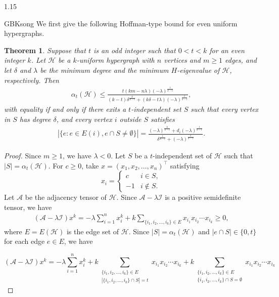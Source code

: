 \documentclass[preprint,12pt]{elsarticle}
\newtheorem{thm}{Theorem}[section]
\begin{document}
\begin{spacing}{1.15}
\begin{CJK*}{GBK}{song}
We first give the following Hoffman-type bound for even uniform hypergraphs.
\begin{thm}\label{t}
Suppose that $t$ is an odd integer such that $0<t<k$ for an even integer $k$. Let $\mathcal{H}$ be a $k$-uniform hypergraph with $n$ vertices and $m\geq1$ edges, and let $\delta$ and $\lambda$ be the minimum degree and the minimum $H$-eigenvalue of $\mathcal{H}$, respectively. Then
\begin{eqnarray*}
{\alpha _t}(\mathcal{H}) \leqslant \frac{{t\left( {km - n \lambda } \right){{\left( { - \lambda } \right)}^{\frac{t}{{k - t}}}}}}{{\left( {k - t} \right){\delta ^{\frac{k}{{k - t}}}} + \left( {k \delta  - t\lambda } \right){{\left( { - \lambda } \right)}^{\frac{t}{{k - t}}}}}},
\end{eqnarray*}
with equality if and only if there exits a $t$-independent set $S$ such that every vertex in $S$ has degree $\delta$, and every vertex $i$ outside $S$ satisfies
\begin{eqnarray*}
\left| {\{ e:e \in E(i),e\cap S\neq\emptyset \} } \right| = \frac{{{{\left( { - \lambda } \right)}^{\frac{k}{{k - t}}}} + {d_i}{{\left( { - \lambda } \right)}^{\frac{t}{{k - t}}}}}}{{{\delta ^{\frac{t}{{k - t}}}} + {{\left( { - \lambda } \right)}^{\frac{t}{{k - t}}}}}}.
\end{eqnarray*}
\end{thm}
\begin{proof}
Since $m\geq1$, we have $\lambda<0$. Let $S$ be a $t$-independent set of $\mathcal{H}$ such that $|S|=\alpha_t(\mathcal{H})$. For $c\geq0$, take $x=(x_1,x_2,\ldots,x_n)^\top$ satisfying
$${x_i} =
\begin{cases}
c & i \in S,\\
- 1 & i \notin S.
\end{cases}
$$
Let $\mathcal{A}$ be the adjacency tensor of $\mathcal{H}$. Since $\mathcal{A}-\lambda \mathcal{I}$ is a positive semidefinite tensor, we have
\begin{eqnarray*}
(\mathcal{A}-\lambda \mathcal{I})x^k=-\lambda\sum_{i=1}^nx_i^{k}+k\sum_{\{ i_1,i_2,\ldots,i_k\}\in E}x_{i_1}x_{i_2}\cdots x_{i_k}\geq0,
\end{eqnarray*}
where $E=E(\mathcal{H})$ is the edge set of $\mathcal{H}$.
Since $|S|=\alpha_t(\mathcal{H})$ and $|e\cap S|\in\{0,t\}$ for each edge $e\in E$, we have

\[( {\mathcal{A}}-\lambda \mathcal{I} )x^k = -\lambda\sum_{i=1}^nx_i^k  +k
 \sum_{\substack{\{i_1,i_2,\ldots,i_k\}\in E\\ |\{i_1,i_2,\ldots,i_k\}\cap S|=t}}
{{x_{{i_1}}}{x_{{i_2}}} \cdots {x_{{i_k}}}}  +k
\sum_{\substack{\{i_1,i_2,\ldots,i_k\} \in E\\ \{i_1,i_2,\ldots,i_k\} \cap S = \emptyset}} {{x_{{i_1}}}{x_{{i_2}}} \cdots {x_{{i_k}}}} \]



\end{proof}
\end{CJK*}
\end{spacing}
\end{document}
